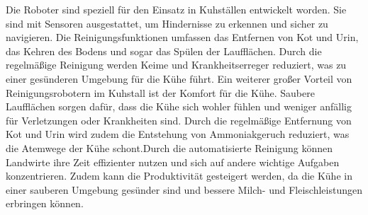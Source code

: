 Die Roboter sind speziell für den Einsatz in Kuhställen
entwickelt worden. Sie sind mit Sensoren ausgestattet, um Hindernisse zu
erkennen und sicher zu navigieren. Die Reinigungsfunktionen umfassen das
Entfernen von Kot und Urin, das Kehren des Bodens und sogar das Spülen der
Laufflächen. Durch die regelmäßige Reinigung werden Keime und Krankheitserreger
reduziert, was zu einer gesünderen Umgebung für die Kühe führt. Ein weiterer
großer Vorteil von Reinigungsrobotern im Kuhstall ist der Komfort für die Kühe.
Saubere Laufflächen sorgen dafür, dass die Kühe sich wohler fühlen und weniger
anfällig für Verletzungen oder Krankheiten sind. Durch die regelmäßige
Entfernung von Kot und Urin wird zudem die Entstehung von Ammoniakgeruch
reduziert, was die Atemwege der Kühe schont.Durch die automatisierte Reinigung
können Landwirte ihre Zeit effizienter nutzen und sich auf andere wichtige
Aufgaben konzentrieren. Zudem kann die Produktivität gesteigert werden, da die
Kühe in einer sauberen Umgebung gesünder sind und bessere Milch- und
Fleischleistungen erbringen können.\cite{agrarheute}